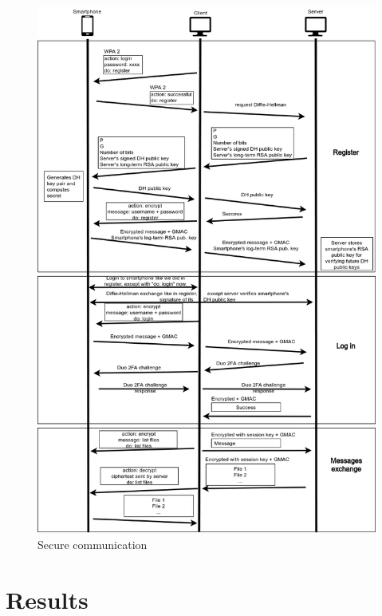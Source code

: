 \documentclass[12pt]{article}
\begin{document}
\setcounter{figure}{0} %
\begin{figure}[H]
\centering
\includegraphics[width=11.8cm]{secure_channel.png}
\caption{Secure communication}
\end{figure}

\newpage
\section{Results}
\end{document}
